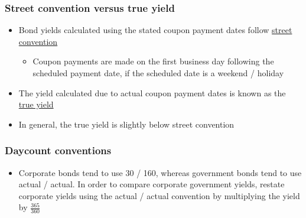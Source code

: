 \documentclass[../notes_compiled.tex]{subfiles}
\begin{document}
\subsubsection{Street convention versus true yield}
\begin{itemize}
\item Bond yields calculated using the stated coupon payment dates follow \underline{street convention}
\begin{itemize}
\item Coupon payments are made on the first business day following the scheduled payment date, if the scheduled date is a weekend / holiday
\end{itemize}
\item The yield calculated due to actual coupon payment dates is known as the \underline{true yield}
\item[] In general, the true yield is slightly below street convention
\end{itemize}

\subsubsection{Daycount conventions}
\begin{itemize}
\item Corporate bonds tend to use 30 / 160, whereas government bonds tend to use actual / actual. In order to compare corporate government yields, restate corporate yields using the actual / actual convention by multiplying the yield by $\frac{365}{360}$
\end{itemize}
\end{document}
